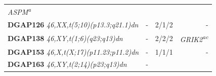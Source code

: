 \documentclass[a4paper,twoside=true,openright,parskip=full,chapterprefix=true,11pt,headings=normal,bibliography=totoc,listof=totoc,titlepage=on,captions=tableabove,draft=false]{scrreprt}
\theoremstyle{definition}
\theoremstyle{definition}
\theoremstyle{definition}
\theoremstyle{remark}
\begin{document}
\begin{longtable}[]{@{}lllr@{}}
\begin{minipage}[t]{0.18\columnwidth}
\emph{ASPM\textsuperscript{a}}\strut
\end{minipage}\tabularnewline
\begin{minipage}[t]{0.25\columnwidth}\raggedright
\textbf{DGAP126} \emph{46,XX,t(5;10)(p13.3;q21.1)dn}\strut
\end{minipage} & \begin{minipage}[t]{0.19\columnwidth}\raggedright
-\strut
\end{minipage} & \begin{minipage}[t]{0.26\columnwidth}\raggedright
2/1/2\strut
\end{minipage} & \begin{minipage}[t]{0.18\columnwidth}\raggedleft
-\strut
\end{minipage}\tabularnewline
\begin{minipage}[t]{0.25\columnwidth}\raggedright
\textbf{DGAP138} \emph{46,XY,t(1;6)(q23;q13)dn}\strut
\end{minipage} & \begin{minipage}[t]{0.19\columnwidth}\raggedright
-\strut
\end{minipage} & \begin{minipage}[t]{0.26\columnwidth}\raggedright
2/2/2\strut
\end{minipage} & \begin{minipage}[t]{0.18\columnwidth}\raggedleft
\emph{GRIK2\textsuperscript{ac}}\strut
\end{minipage}\tabularnewline
\begin{minipage}[t]{0.25\columnwidth}\raggedright
\textbf{DGAP153} \emph{46,X,t(X;17)(p11.23;p11.2)dn}\strut
\end{minipage} & \begin{minipage}[t]{0.19\columnwidth}\raggedright
-\strut
\end{minipage} & \begin{minipage}[t]{0.26\columnwidth}\raggedright
1/1/1\strut
\end{minipage} & \begin{minipage}[t]{0.18\columnwidth}\raggedleft
-\strut
\end{minipage}\tabularnewline
\begin{minipage}[t]{0.25\columnwidth}\raggedright
\textbf{DGAP163} \emph{46,XY,t(2;14)(p23;q13)dn}\strut
\end{minipage} & \begin{minipage}[t]{0.19\columnwidth}\raggedright
-\strut
\end{minipage} & \begin{minipage}[t]{0.26\columnwidth}\raggedright

\end{minipage}
\end{longtable}
\end{document}
